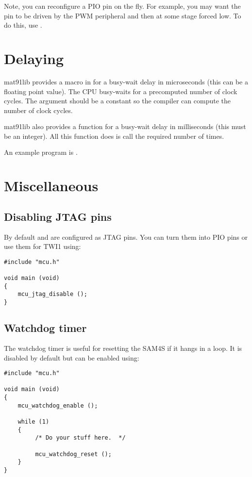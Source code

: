Note, you can reconfigure a PIO pin on the fly.  For example, you may
want the pin to be driven by the PWM peripheral and then at some stage
forced low.  To do this, use .


\section{Delaying}

mat91lib provides a macro  in 
for a busy-wait delay in microseconds (this can be a floating point
value).  The CPU busy-waits for a precomputed number of clock cycles.
The argument should be a constant so the compiler can compute the
number of clock cycles.

mat91lib also provides a function  for a busy-wait
delay in milliseconds (this must be an integer).  All this function
does is call  the required number of times.

An example program is .



\section{Miscellaneous}

\subsection{Disabling JTAG pins}
\label{disabling-jtag-pins}

By default  and  are configured as JTAG pins. You can turn
them into PIO pins or use them for TWI1 using:
%
\begin{verbatim}
#include "mcu.h"

void main (void)
{
    mcu_jtag_disable ();
}
\end{verbatim}


\subsection{Watchdog timer}
\label{watchdog-timer}

The watchdog timer is useful for resetting the SAM4S if it hangs in a
loop.  It is disabled by default but can be enabled using:
%
\begin{verbatim}
#include "mcu.h"

void main (void)
{
    mcu_watchdog_enable ();
   
    while (1)
    {
         /* Do your stuff here.  */

         mcu_watchdog_reset ();
    }
}
\end{verbatim}


